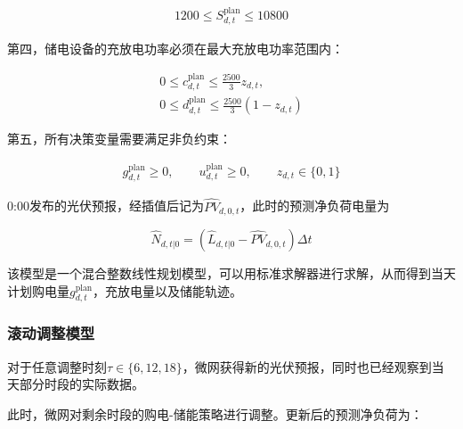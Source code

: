 \documentclass[UTF8]{ctexart}
\begin{document}
    \begin{equation}
        \begin{aligned}
            1200 \leq S_{d,t}^{\mathrm{plan}} \leq 10800
        \end{aligned}		
    \end{equation}
    
    第四，储电设备的充放电功率必须在最大充放电功率范围内：
    
    \begin{equation}
        \begin{aligned}
            0 \leq c_{d,t}^{\mathrm{plan}} \leq \frac{2500}{3}z_{d,t}, \\
            0 \leq d_{d,t}^{\mathrm{plan}} \leq \frac{2500}{3}(1-z_{d,t})
        \end{aligned}
    \end{equation}
    
    第五，所有决策变量需要满足非负约束：
    
    \begin{equation}
        \begin{aligned}
            g_{d,t}^{\mathrm{plan}} \geq 0,\qquad u_{d,t}^{\mathrm{plan}} \geq 0,\qquad z_{d,t} \in \{0,1\}
        \end{aligned}
    \end{equation}
    
    0:00发布的光伏预报，经插值后记为$\widehat{PV}_{d,0,t}$，此时的预测净负荷电量为
    
    \begin{equation}
        \widehat N_{d,t|0}
        =\left(
        \widehat L_{d,t|0}
        -\widehat{PV}_{d,0,t}
        \right)\Delta t
    \end{equation}
    
    该模型是一个混合整数线性规划模型，可以用标准求解器进行求解，从而得到当天计划购电量$g_{d,t}^{\mathrm{plan}}$，充放电量以及储能轨迹。\par
    
    \subsubsection{滚动调整模型}
    
    对于任意调整时刻$\tau\in\{6,12,18\}$，微网获得新的光伏预报，同时也已经观察到当天部分时段的实际数据。\par
    
    此时，微网对剩余时段的购电-储能策略进行调整。更新后的预测净负荷为：
    
\end{document}
